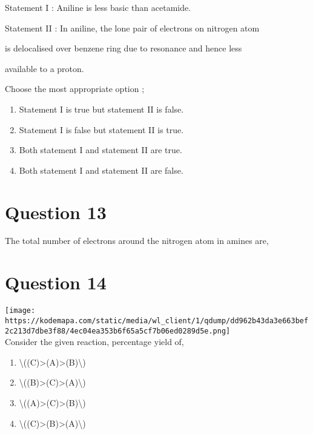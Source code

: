 \documentclass{article}
\begin{document}
Statement I : Aniline is less basic than acetamide.



Statement II : In aniline, the lone pair of electrons on nitrogen atom

is delocalised over benzene ring due to resonance and hence less

available to a proton.



Choose the most appropriate option ;


\begin{enumerate}[label=(\alph*)]
\item Statement I is true but statement II is false.


\item Statement I is false but statement II is true.


\item Both statement I and statement II are true.


\item Both statement I and statement II are false.


\end{enumerate}
\newpage
\section*{Question 13}
The total number of electrons around the nitrogen atom in amines are,


\begin{enumerate}[label=(\alph*)]
\end{enumerate}
\newpage
\section*{Question 14}
\texttt{[image: https://kodemapa.com/static/media/wl\_client/1/qdump/dd962b43da3e663bef2c213d7dbe3f88/4ec04ea353b6f65a5cf7b06ed0289d5e.png]}\\



Consider the given reaction, percentage yield of,~


\begin{enumerate}[label=(\alph*)]
\item \textbackslash((C)\textgreater(A)\textgreater(B)\textbackslash)


\item \textbackslash((B)\textgreater(C)\textgreater(A)\textbackslash)


\item \textbackslash((A)\textgreater(C)\textgreater(B)\textbackslash)


\item \textbackslash((C)\textgreater(B)\textgreater(A)\textbackslash)


\end{enumerate}
\newpage
\end{document}
